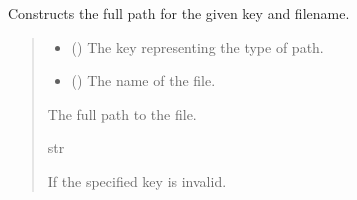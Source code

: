 \documentclass[letterpaper,10pt,english]{sphinxmanual}
\begin{document}
\begin{fulllineitems}
\begin{fulllineitems}
\begin{quote}
\begin{description}
\end{description}\end{quote}

\end{fulllineitems}


\begin{fulllineitems}
\label{\detokenize{modules:application.services.FileSystemService.FileSystemService.get_path}}
\pysigstartsignatures
{}
\pysigstopsignatures
\sphinxAtStartPar
Constructs the full path for the given key and filename.
\begin{quote}\begin{description}
\begin{itemize}
\item {} 
\sphinxAtStartPar
{} ({\hyperref[\detokenize{modules:domain.enums.PathKey.PathKey}]{}}) \textendash{} The key representing the type of path.

\item {} 
\sphinxAtStartPar
{} () \textendash{} The name of the file.

\end{itemize}

\sphinxAtStartPar
The full path to the file.

\sphinxAtStartPar
str

\sphinxAtStartPar
{} \textendash{} If the specified key is invalid.

\end{description}\end{quote}

\end{fulllineitems}


\end{fulllineitems}
\end{document}

